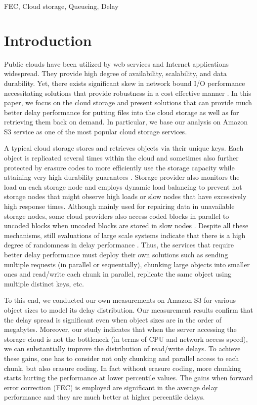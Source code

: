 \documentclass[journal]{IEEEtran}
\begin{document}
\begin{IEEEkeywords}
FEC, Cloud storage, Queueing, Delay
\end{IEEEkeywords}


\IEEEpeerreviewmaketitle

\section{Introduction}
\label{sec:intro}


Public clouds have been utilized by web services and Internet applications widespread. They provide high degree of availability, scalability, and data durability. 
Yet, there exists significant skew in network bound I/O performance necessitating solutions that provide robustness in a cost effective manner \cite{Garfinkel07anevaluation,Wang:2010}. In this paper, we focus on the cloud storage and present solutions that can provide much better delay performance for putting files into the cloud storage as well as for retrieving them back on demand. In particular, we base our analysis on Amazon S3 service as one of the most popular cloud storage services.

A typical cloud storage stores and retrieves objects via their unique keys. Each object is replicated several times within the cloud and sometimes also further protected by erasure codes to more efficiently use the storage capacity while attaining very high durability guarantees \cite{Huang12}. Storage provider also monitors the load on each storage node and employs dynamic load balancing to prevent hot storage nodes that might observe high loads or slow nodes that have excessively high response times. Although mainly used for repairing data in unavailable storage nodes, some cloud providers also access coded blocks in parallel to uncoded blocks when uncoded blocks are stored in slow nodes \cite{Huang12}. Despite all these mechanisms, still evaluations of large scale systems indicate that there is a high degree of randomness in delay performance \cite{Garfinkel07anevaluation}. Thus, the services that require better delay performance must deploy their own solutions such as sending multiple requests (in parallel or sequentially), chunking large objects into smaller ones and read/write each chunk in parallel, replicate the same object using multiple distinct keys, etc. 

To this end, we conducted our own measurements on Amazon S3 for various object sizes to model its delay distribution. Our measurement results confirm that the delay spread is significant even when object sizes are in the order of megabytes. Moreover, our study indicates that when the server accessing the storage cloud is not the bottleneck (in terms of CPU and network access speed),  we can substantially improve the distribution of read/write delays. To achieve these gains, one has to consider not only chunking and parallel access to each chunk, but also erasure coding. In fact without erasure coding, more chunking starts hurting the performance at lower percentile values. The gains when forward error correction (FEC) is employed are significant in the average delay performance and they are much better at higher percentile delays.  
\end{document}
